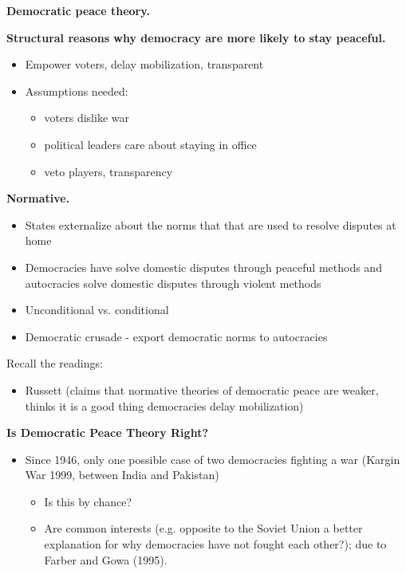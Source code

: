 \documentclass{article}
\begin{document}
{\bf Democratic peace theory.}

{\bf Structural reasons why democracy are more likely to stay peaceful.}

\begin{itemize}
  \item Empower voters, delay mobilization, transparent
  \item Assumptions needed:
    \begin{itemize}
      \item voters dislike war
      \item political leaders care about staying in office
      \item veto players, transparency
    \end{itemize}
\end{itemize}

{\bf Normative.}

\begin{itemize}
  \item States externalize about the norms that that are used to resolve disputes at home
  \item Democracies have solve domestic disputes through peaceful methods and autocracies solve domestic disputes through violent methods
  \item Unconditional vs. conditional
  \item Democratic crusade - export democratic norms to autocracies
\end{itemize}

Recall the readings:

\begin{itemize}
  \item Russett (claims that normative theories of democratic peace are weaker, thinks it is a good thing democracies delay mobilization)
\end{itemize}

{\bf Is Democratic Peace Theory Right?}

\begin{itemize}
  \item Since 1946, only one possible case of two democracies fighting a war (Kargin War 1999, between India and Pakistan)
    \begin{itemize}
      \item Is this by chance?
      \item Are common interests (e.g. opposite to the Soviet Union a better explanation for why democracies have not fought each other?); due to Farber and Gowa (1995).
    \end{itemize}
\end{itemize}
\end{document}
